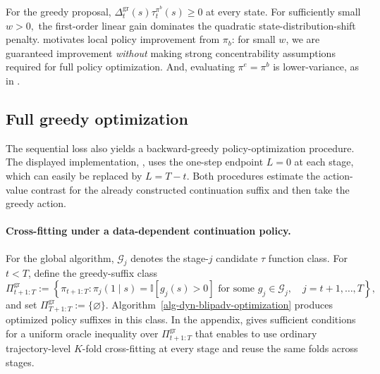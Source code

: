 \documentclass[opre,nonblindrev]{informs4}
\newenvironment{revision}{\begingroup\color{revisionblue}\ignorespaces}{\endgroup}
\providecommand{\cG}{\mathcal G}
\newcommand{\blipadv}{\tau}
\begin{document}
\begin{revision}
For the greedy proposal,
  $\Delta_t^{\mathrm{gr}}(s)\blipadv_t^{\pi^b}
  (s)\geq0$ at every state.
For sufficiently small $w>0,$ the first-order linear
  gain dominates the
  quadratic state-distribution-shift penalty.
 motivates local policy improvement from $\pi_b$: for small $w$, we are guaranteed improvement \textit{without} making strong concentrability assumptions required for full policy optimization. And, evaluating $\pi^e=\pi^b$ is lower-variance, as in .
\end{revision}


\subsection{Full greedy optimization}
\label{sec-global-policy}

The sequential loss also yields a backward-greedy policy-optimization
procedure. The displayed implementation,
, uses the one-step endpoint $L=0$ at each
stage, which can easily be replaced by $L=T-t$. Both procedures estimate
the action-value contrast for the already constructed continuation suffix and
then take the greedy action.

\paragraph{Cross-fitting under a data-dependent continuation policy.}
For the global algorithm, $\cG_j$ denotes the stage-$j$ candidate $\blipadv$ function
class. For $t<T$, define the
greedy-suffix class
\[
\Pi_{t+1:T}^{\mathrm{gr}}
:=
\left\{
\pi_{t+1:T}:
\pi_j(1\mid s)=\mathbb I[g_j(s)>0]
\text{ for some }g_j\in\cG_j,
\quad j=t+1,\ldots,T
\right\},
\]
and set $\Pi_{T+1:T}^{\mathrm{gr}}:=\{\varnothing\}$. 
Algorithm~\ref{alg-dyn-blipadv-optimization} produces optimized policy suffixes in this class. In the appendix, 
 gives sufficient conditions for a uniform oracle
inequality over $\Pi_{t+1:T}^{\mathrm{gr}}$ that enables  to use ordinary
trajectory-level $K$-fold cross-fitting at every stage and reuse the same
folds across stages. 
\end{document}
